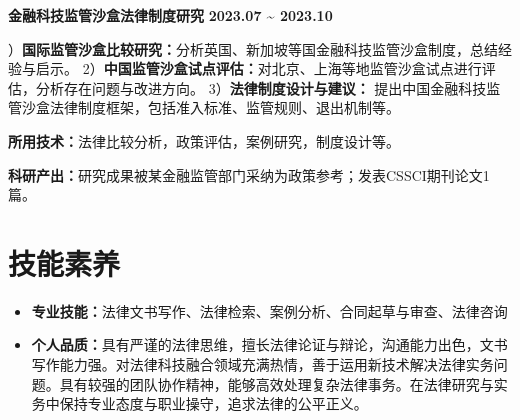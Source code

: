 \documentclass[11pt,a4paper]{ctexart}
\begin{document}
\noindent
\textcolor{sectioncolor}{\textbf{金融科技监管沙盒法律制度研究}} \hfill \textcolor{sectioncolor}{\textbf{2023.07 \textasciitilde{} 2023.10}}
\par{}）\textbf{国际监管沙盒比较研究：}分析英国、新加坡等国金融科技监管沙盒制度，总结经验与启示。
2）\textbf{中国监管沙盒试点评估：}对北京、上海等地监管沙盒试点进行评估，分析存在问题与改进方向。
3）\textbf{法律制度设计与建议：} 提出中国金融科技监管沙盒法律制度框架，包括准入标准、监管规则、退出机制等。
\par\noindent
\textbf{所用技术：}法律比较分析，政策评估，案例研究，制度设计等。
\par\noindent
\textbf{科研产出：}研究成果被某金融监管部门采纳为政策参考；发表CSSCI期刊论文1篇。
\vspace{0.2em}

\section*{技能素养}
\vspace{-0.1em}
\begin{itemize}
    \item \textbf{专业技能：}法律文书写作、法律检索、案例分析、合同起草与审查、法律咨询
    \item \textbf{个人品质：}具有严谨的法律思维，擅长法律论证与辩论，沟通能力出色，文书写作能力强。对法律科技融合领域充满热情，善于运用新技术解决法律实务问题。具有较强的团队协作精神，能够高效处理复杂法律事务。在法律研究与实务中保持专业态度与职业操守，追求法律的公平正义。
\end{itemize}
\end{document}

